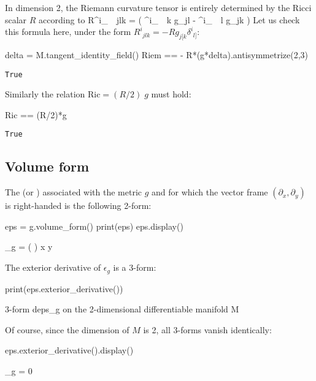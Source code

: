 In dimension 2, the Riemann curvature tensor is entirely determined by the Ricci scalar $R$ according to
\be
 R^i_{\ \, jlk} =  \left( \delta^i_{\ \, k} g_{jl} - \delta^i_{\ \, l} g_{jk} \right)
\ee
Let us check this formula here, under the form
$R^i_{\ \, jlk} = -R g_{j[k} \delta^i_{\ \, l]}$:
\begin{NBin}
delta = M.tangent_identity_field()
Riem == - R*(g*delta).antisymmetrize(2,3)
\end{NBin}
\begin{NBout}
\texttt{True}
\end{NBout}
Similarly the relation $\mathrm{Ric} = (R/2)\; g$ must hold:
\begin{NBin}
Ric == (R/2)*g
\end{NBin}
\begin{NBout}
\texttt{True}
\end{NBout}

\vspace*{-1.1\baselineskip}

\subsection{Volume form}

The  (or ) associated with the
metric $g$ and for which the vector frame $(\partial_x,\partial_y)$ is
right-handed is the following 2-form:
\begin{NBin}
eps = g.volume_form()
print(eps)
eps.display()
\end{NBin}
\begin{NBoutM}
\epsilon_{g} = \left(  \right)  x\wedge {} y
\end{NBoutM}
The exterior derivative of $\epsilon_g$ is a 3-form:
\begin{NBin}
print(eps.exterior_derivative())
\end{NBin}
\begin{NBprint}
3-form deps_g on the 2-dimensional differentiable manifold M
\end{NBprint}
Of course, since the dimension of $M$ is 2, all 3-forms vanish identically:
\begin{NBin}
eps.exterior_derivative().display()
\end{NBin}
\begin{NBoutM}
\epsilon_{g} = 0
\end{NBoutM}
